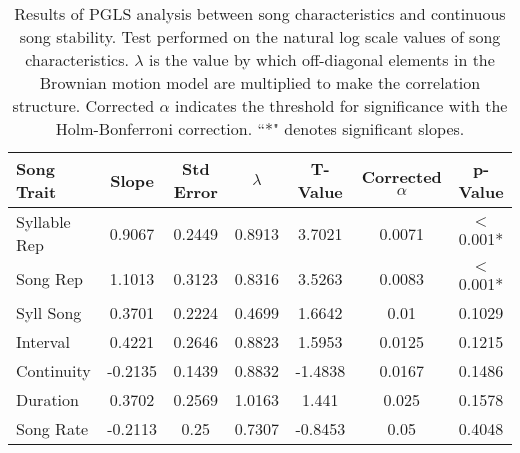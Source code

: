 \documentclass[a4paper,12pt]{article}
\begin{document}
\begin{table}[ht]
\caption{Results of PGLS analysis between song characteristics and continuous song stability. Test performed on the natural log scale values of song characteristics. $\lambda$ is the value by which off-diagonal elements in the Brownian motion model are multiplied to make the correlation structure.  Corrected $\alpha$ indicates the threshold for significance with the Holm-Bonferroni correction. ``*" denotes significant slopes.}
\centering
\begin{tabular}{lcccccc}
  \hline
Song Trait & Slope & Std Error & $\lambda$ & T-Value & Corrected $\alpha$ & p-Value \\ 
 \hline
Syllable Rep & 0.9067 & 0.2449 & 0.8913 & 3.7021 & 0.0071 & $<$0.001* \\ 
  Song Rep & 1.1013 & 0.3123 & 0.8316 & 3.5263 & 0.0083 & $<$0.001* \\ 
  Syll Song & 0.3701 & 0.2224 & 0.4699 & 1.6642 & 0.01 & 0.1029 \\ 
  Interval & 0.4221 & 0.2646 & 0.8823 & 1.5953 & 0.0125 & 0.1215 \\ 
  Continuity & -0.2135 & 0.1439 & 0.8832 & -1.4838 & 0.0167 & 0.1486 \\ 
  Duration & 0.3702 & 0.2569 & 1.0163 & 1.441 & 0.025 & 0.1578 \\ 
  Song Rate & -0.2113 & 0.25 & 0.7307 & -0.8453 & 0.05 & 0.4048 \\ 
   \hline
\end{tabular}
\end{table}
\end{document}
